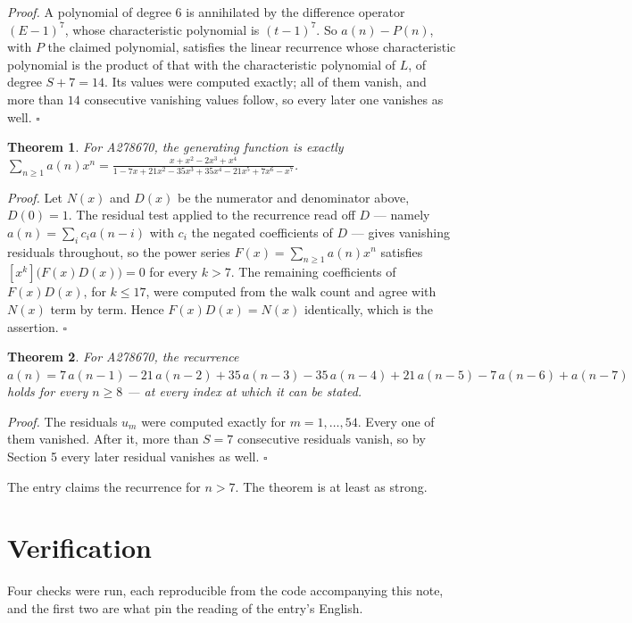 \documentclass[11pt]{article}
\newtheorem{theorem}{Theorem}
\theoremstyle{definition}
\begin{document}
{\itshape Proof.} A polynomial of degree $6$ is annihilated by the difference operator $(E-1)^{7}$, whose characteristic polynomial is $(t-1)^{7}$. So $a(n) - P(n)$, with $P$ the claimed polynomial, satisfies the linear recurrence whose characteristic polynomial is the product of that with the characteristic polynomial of $L$, of degree $S + 7 = 14$. Its values were computed exactly; all of them vanish, and more than $14$ consecutive vanishing values follow, so every later one vanishes as well. $\square$

\begin{theorem} For A278670, the generating function is exactly $\sum_{n\ge 1} a(n)x^n = \frac{x + x^{2} - 2x^{3} + x^{4}}{1 - 7x + 21x^{2} - 35x^{3} + 35x^{4} - 21x^{5} + 7x^{6} - x^{7}}$.\end{theorem}

{\itshape Proof.} Let $N(x)$ and $D(x)$ be the numerator and denominator above, $D(0)=1$. The residual test applied to the recurrence read off $D$ --- namely $a(n) = \sum_i c_i a(n-i)$ with $c_i$ the negated coefficients of $D$ --- gives vanishing residuals throughout, so the power series $F(x)=\sum_{n\ge 1}a(n)x^n$ satisfies $[x^k]\bigl(F(x)D(x)\bigr) = 0$ for every $k > 7$. The remaining coefficients of $F(x)D(x)$, for $k \le 17$, were computed from the walk count and agree with $N(x)$ term by term. Hence $F(x)D(x) = N(x)$ identically, which is the assertion. $\square$

\begin{theorem} For A278670, the recurrence $a(n) = 7\,a(n-1) - 21\,a(n-2) + 35\,a(n-3) - 35\,a(n-4) + 21\,a(n-5) - 7\,a(n-6) + a(n-7)$ holds for every $n \ge 8$ --- at every index at which it can be stated.\end{theorem}

{\itshape Proof.} The residuals $u_m$ were computed exactly for $m = 1,\dots,54$. Every one of them vanished. After it, more than $S = 7$ consecutive residuals vanish, so by Section 5 every later residual vanishes as well. $\square$

The entry claims the recurrence for $n > 7$. The theorem is at least as strong.

\section{Verification}

Four checks were run, each reproducible from the code accompanying this note, and the first two are what pin the reading of the entry's English.
\end{document}
